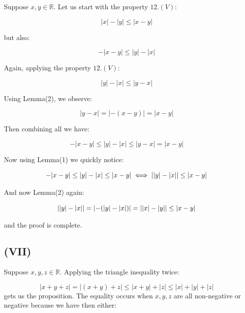 \documentclass{article}
\begin{document}
Suppose \(x, y \in \mathbb{R}\). Let us start with the property \(12.(V)\):

\begin{equation*}
	|x| - |y| \leq |x-y|
\end{equation*}

but also:

\begin{equation*}
	-|x - y| \leq |y| - |x|
\end{equation*}

Again, applying the property \(12.(V)\):

\begin{equation*}
	|y| - |x| \leq |y - x|
\end{equation*}

Using Lemma(2), we observe:

\begin{equation*}
	|y - x| = |-(x - y)| = |x-y|
\end{equation*}

Then combining all we have:

\begin{equation*}
	-|x - y| \leq |y| - |x| \leq |y - x| = |x-y|
\end{equation*}

Now using Lemma(1) we quickly notice:

\begin{equation*}
	-|x - y| \leq |y| - |x| \leq |x-y| \iff \abs{|y| - |x|} \leq |x-y|
\end{equation*}

And now Lemma(2) again:

\begin{equation*}
	\abs{|y| - |x|} = \abs{-(|y| - |x|)} = \abs{|x| - |y|}  \leq |x-y|
\end{equation*}

and the proof is complete.

\subsection*{(VII)}

Suppose \(x, y, z \in \mathbb{R}\). Applying the triangle inequality twice:

\begin{equation*}
	|x + y + z| = |(x + y) + z| \leq |x + y| + |z| \leq |x| + |y| + |z|
\end{equation*}
gets us the proposition. The equality occurs when \(x,y,z\) are all non-negative or negative because we have then either:
\end{document}
